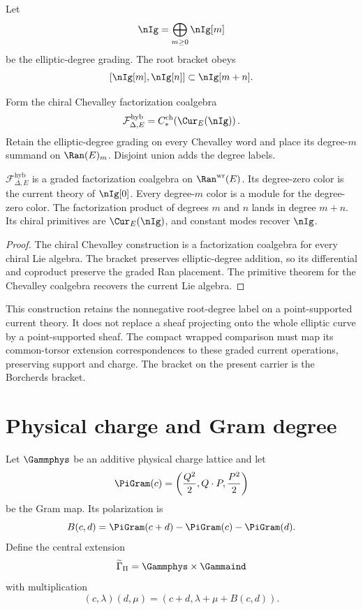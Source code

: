 Let
\[
 \nIg=\bigoplus_{m\ge0}\nIg[m]
\]
be the elliptic-degree grading.  The root bracket obeys
\[
 [\nIg[m],\nIg[n]]\subset\nIg[m+n].
\]

\begin{construction}
Form the chiral Chevalley factorization coalgebra
\[
 \mathcal F^{\mathrm{hyb}}_{\Delta,E}
 =C_*^{\mathrm{ch}}\!\left(\Cur_E(\nIg)\right).
\]
Retain the elliptic-degree grading on every Chevalley word and place its degree-$m$ summand on $\Ran(E)_m$.  Disjoint union adds the degree labels.
\end{construction}

\begin{theorem}
$\mathcal F^{\mathrm{hyb}}_{\Delta,E}$ is a graded factorization coalgebra on $\Ran^{\mathrm{wr}}(E)$.  Its degree-zero color is the current theory of $\nIg[0]$.  Every degree-$m$ color is a module for the degree-zero color.  The factorization product of degrees $m$ and $n$ lands in degree $m+n$.  Its chiral primitives are $\Cur_E(\nIg)$, and constant modes recover $\nIg$.
\end{theorem}
\begin{proof}
The chiral Chevalley construction is a factorization coalgebra for every chiral Lie algebra.  The bracket preserves elliptic-degree addition, so its differential and coproduct preserve the graded Ran placement.  The primitive theorem for the Chevalley coalgebra recovers the current Lie algebra.
\end{proof}

This construction retains the nonnegative root-degree label on a
point-supported current theory. It does not replace a sheaf projecting
onto the whole elliptic curve by a point-supported sheaf. The compact
wrapped comparison must map its common-torsor extension correspondences
to these graded current operations, preserving support and charge.
The bracket on the present carrier is the Borcherds bracket.

\chapter{Physical charge and Gram degree}
Let $\Gammphys$ be an additive physical charge lattice and let
\[
 \PiGram(c)=\left(\frac{Q^2}{2},Q\cdot P,\frac{P^2}{2}\right)
\]
be the Gram map.  Its polarization is
\[
 B(c,d)=\PiGram(c+d)-\PiGram(c)-\PiGram(d).
\]
Define the central extension
\[
 \widetilde\Gamma_\Pi=\Gammphys\times\Gammaind
\]
with multiplication
\[
 (c,\lambda)(d,\mu)
 =(c+d,\lambda+\mu+B(c,d)).
\]

